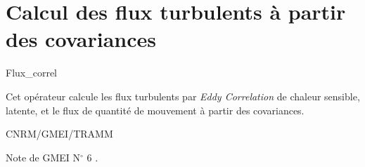 %
\section{Calcul des flux turbulents \`a partir des covariances}

 {\sf Flux\_correl}

Cet op\'erateur calcule les flux turbulents par \textit{Eddy Correlation} de chaleur
sensible, latente, et le flux de quantit\'e de mouvement \`a partir
des covariances. 

\bigskip





CNRM/GMEI/TRAMM

Note de GMEI N$^{\circ}$ 6 \cite{GMEI-6}.
